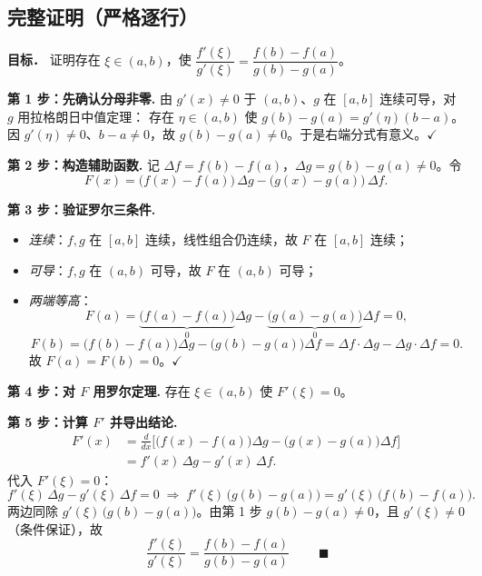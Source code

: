 \documentclass[11pt]{article}
\begin{document}
\subsection*{完整证明（严格逐行）}

\noindent\textbf{目标．} 证明存在 $\xi\in(a,b)$，使
$\dfrac{f'(\xi)}{g'(\xi)}=\dfrac{f(b)-f(a)}{g(b)-g(a)}$。

\vspace{2mm}
\noindent\textbf{第 1 步：先确认分母非零.}
由 $g'(x)\neq0$ 于 $(a,b)$、$g$ 在 $[a,b]$ 连续可导，对 $g$ 用拉格朗日中值定理：
存在 $\eta\in(a,b)$ 使 $g(b)-g(a)=g'(\eta)(b-a)$。
因 $g'(\eta)\neq0$、$b-a\neq0$，故 $g(b)-g(a)\neq0$。于是右端分式有意义。$\checkmark$

\vspace{2mm}
\noindent\textbf{第 2 步：构造辅助函数.} 记 $\Delta f=f(b)-f(a)$，$\Delta g=g(b)-g(a)\neq0$。令
\[
F(x)=\big(f(x)-f(a)\big)\,\Delta g-\big(g(x)-g(a)\big)\,\Delta f .
\]

\vspace{2mm}
\noindent\textbf{第 3 步：验证罗尔三条件.}
\begin{itemize}
  \item \emph{连续}：$f,g$ 在 $[a,b]$ 连续，线性组合仍连续，故 $F$ 在 $[a,b]$ 连续；
  \item \emph{可导}：$f,g$ 在 $(a,b)$ 可导，故 $F$ 在 $(a,b)$ 可导；
  \item \emph{两端等高}：
  \[
  F(a)=\underbrace{\big(f(a)-f(a)\big)}_{0}\Delta g-\underbrace{\big(g(a)-g(a)\big)}_{0}\Delta f=0,
  \]
  \[
  F(b)=\big(f(b)-f(a)\big)\Delta g-\big(g(b)-g(a)\big)\Delta f
      =\Delta f\cdot\Delta g-\Delta g\cdot\Delta f=0 .
  \]
  故 $F(a)=F(b)=0$。$\checkmark$
\end{itemize}

\vspace{2mm}
\noindent\textbf{第 4 步：对 $F$ 用罗尔定理.}
存在 $\xi\in(a,b)$ 使 $F'(\xi)=0$。

\vspace{2mm}
\noindent\textbf{第 5 步：计算 $F'$ 并导出结论.}
\begin{align*}
F'(x)&=\frac{d}{dx}\Big[\big(f(x)-f(a)\big)\Delta g-\big(g(x)-g(a)\big)\Delta f\Big]\\
     &=f'(x)\,\Delta g-g'(x)\,\Delta f .
\end{align*}
代入 $F'(\xi)=0$：
\[
f'(\xi)\,\Delta g-g'(\xi)\,\Delta f=0
\;\Longrightarrow\;
f'(\xi)\,\big(g(b)-g(a)\big)=g'(\xi)\,\big(f(b)-f(a)\big).
\]
两边同除 $g'(\xi)\,\big(g(b)-g(a)\big)$。由第 1 步 $g(b)-g(a)\neq0$，且 $g'(\xi)\neq0$（条件保证），故
\[
\boxed{\;\frac{f'(\xi)}{g'(\xi)}=\frac{f(b)-f(a)}{g(b)-g(a)}\;}\qquad\blacksquare
\]
\end{document}
